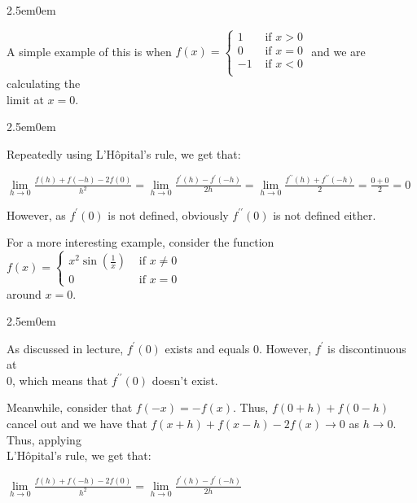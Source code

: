 \documentclass{book}
\newcommand{\pracTwo}{
   \color{Orange}%
   \fontsize{12}{14}\selectfont%
}
\newenvironment{myIndent}{%
   \begin{adjustwidth}{2.5em}{0em}%
}{%
   \end{adjustwidth}%
}
\newcommand{\pprime}{{\prime\prime}}
\newcommand{\retTwo}{\hfill\bigbreak}
\begin{document}
{\begin{myIndent}\pracTwo
   A simple example of this is when $f(x) = \left\{\begin{matrix}
      1 & \text{ if } x > 0 \\
      0 & \text{ if } x = 0 \\
      -1 & \text{ if } x < 0 \\
   \end{matrix}\right.$ and we are calculating the\\ [-14pt] limit at $x = 0$.\\

   
   \begin{myIndent}
      Repeatedly using L'Hôpital's rule, we get that:
      {\center $\lim\limits_{h\rightarrow 0}\frac{f(h) + f(-h) - 2f(0)}{h^2} = \lim\limits_{h\rightarrow 0}\frac{f^\prime(h) - f^\prime(-h)}{2h} = \lim\limits_{h\rightarrow 0}\frac{f^\pprime(h) + f^\pprime(-h)}{2} = \frac{0 + 0}{2} = 0$\retTwo\par}

      However, as $f^\prime(0)$ is not defined, obviously $f^\pprime(0)$ is not defined either.\retTwo
   \end{myIndent}

   For a more interesting example, consider the function $f(x) = \left\{
   \begin{matrix}
      x^2\sin(\frac{1}{x}) & \text{ if } x \neq 0 \\
      0 & \text{ if } x = 0
   \end{matrix}\right.$\\ [-7pt] around $x = 0$.\retTwo 
   
   \begin{myIndent}
      As discussed in lecture, $f^\prime(0)$ exists and equals $0$. However, $f^\prime$ is discontinuous at\\ $0$, which means that $f^\pprime(0)$ doesn't exist.\retTwo

      Meanwhile, consider that $f(-x) = -f(x)$. Thus, $f(0 + h) + f(0 - h)$ cancel out and we have that $f(x+h) + f(x-h) - 2f(x) \rightarrow 0$ as $h \rightarrow 0$. Thus, applying\\ L'Hôpital's rule, we get that:

      {\center $\lim\limits_{h\rightarrow 0}\frac{f(h) + f(-h) - 2f(0)}{h^2} = \lim\limits_{h\rightarrow 0}\frac{f^\prime(h) - f^\prime(-h)}{2h}$ \par}

      \newpage


\end{myIndent}
\end{myIndent}}
\end{document}
